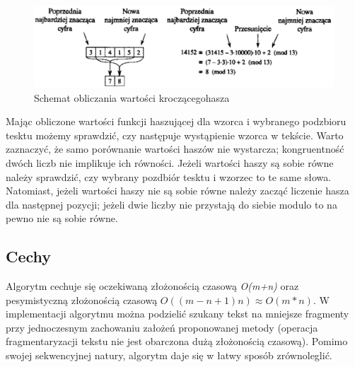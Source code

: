 \begin{figure}[H]
    \centering
    \includegraphics[width=\linewidth]{images/RollingHash.png}
    \caption{Schemat obliczania wartości \glqq kroczącego\grqq \space hasza \cite{cormen}}
    \label{fig:rolling_hash}
\end{figure}
Mając obliczone wartości funkcji haszującej dla wzorca i wybranego podzbioru tesktu możemy sprawdzić, czy następuje wystąpienie wzorca w tekście. Warto zaznaczyć, że samo porównanie wartości haszów nie wystarcza; kongruentność dwóch liczb nie implikuje ich równości. Jeżeli wartości haszy są sobie równe należy sprawdzić, czy wybrany pozdbiór tesktu i wzorzec to te same słowa. Natomiast, jeżeli wartości haszy nie są sobie równe należy zacząć liczenie  hasza dla następnej pozycji; jeżeli dwie liczby nie przystają do siebie modulo to na pewno nie są sobie równe.
\subsection{Cechy}
Algorytm cechuje się oczekiwaną złożonością czasową \textit{O(m+n)} oraz pesymistyczną złożonością czasową \textit{$O((m-n + 1)n) \approx O(m*n)$}. W implementacji algorytmu można podzielić szukany tekst na mniejsze fragmenty przy jednoczesnym zachowaniu założeń proponowanej metody (operacja fragmentaryzacji tekstu nie jest obarczona dużą złożonością czasową). Pomimo swojej sekwencyjnej natury, algorytm daje się w łatwy sposób zrównoleglić. 